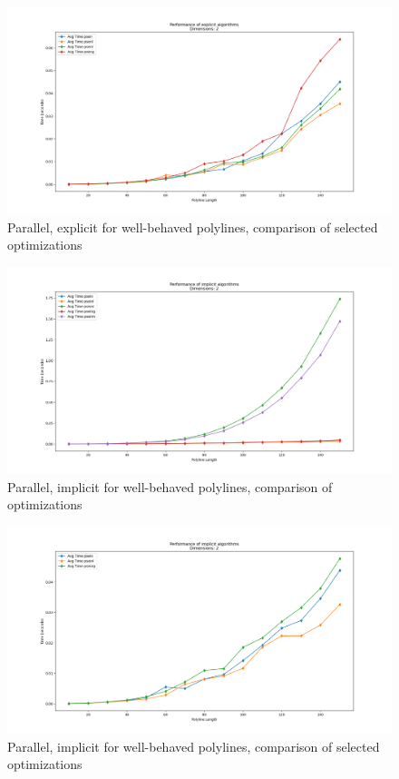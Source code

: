 \begin{figure}[ht]
  \centering
  \includegraphics[scale=0.5, width=\linewidth]{figures/psen-opt2.png}
  \caption{Parallel, explicit for well-behaved polylines, comparison of selected optimizations}
  \label{fig:psen-opt2}
\end{figure}

\begin{figure}[ht]
  \centering
  \includegraphics[scale=0.5, width=\linewidth]{figures/psein-opt1.png}
  \caption{Parallel, implicit for well-behaved polylines, comparison of optimizations}
  \label{fig:psein-opt1}
\end{figure}

\begin{figure}[ht]
  \centering
  \includegraphics[scale=0.5, width=\linewidth]{figures/psein-opt2.png}
  \caption{Parallel, implicit for well-behaved polylines, comparison of selected optimizations}
  \label{fig:psein-opt2}
\end{figure}

